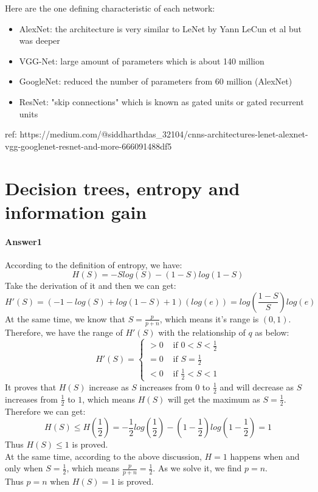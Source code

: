 \documentclass[paper=a4, fontsize=11pt]{scrartcl} %
\numberwithin{equation}{section} %
\numberwithin{figure}{section} %
\numberwithin{table}{section} %
\begin{document}
Here are the one defining characteristic of each network:
\begin{itemize}
	\item AlexNet: the architecture is very similar to LeNet by Yann LeCun et al but was deeper
	\item VGG-Net: large amount of parameters which is about 140 million
	\item GoogleNet: reduced the number of parameters from 60 million (AlexNet) 
	\item ResNet: "skip connections" which is known as gated units or gated recurrent units
\end{itemize}
ref: https://medium.com/@siddharthdas\_32104/cnns-architectures-lenet-alexnet-vgg-googlenet-resnet-and-more-666091488df5

\section{Decision trees, entropy and information gain}
\paragraph{\textbf{Answer1}}
According to the definition of entropy, we have:
\begin{equation*}
H\left ( S \right )=-Slog\left ( S \right )-\left ( 1-S \right )log\left ( 1-S \right )
\end{equation*}
Take the derivation of it and then we can get:
\begin{equation*}
{H}'\left ( S \right )=\left ( -1-log\left ( S \right )+log\left ( 1-S \right )+1 \right )\left ( log\left ( e \right ) \right )=log\left ( \frac{1-S}{S}  \right ) log\left ( e \right )
\end{equation*}
At the same time, we know that $S=\frac{p}{p+n}$, which means it's range is $\left ( 0, 1 \right )$. Therefore, we have the range of ${H}'\left ( S \right )$ with the relationship of $q$ as below:
\begin{equation*}
{H}'\left ( S \right )=\begin{cases}
> 0 & \text{ if } 0<S<\frac{1}{2} \\ 
= 0 & \text{ if } S=\frac{1}{2} \\ 
< 0 & \text{ if } \frac{1}{2}<S<1 
\end{cases}
\end{equation*}
It proves that $H\left ( S \right )$ increase as $S$ increases from $0$ to $\frac{1}{2}$ and will decrease as $S$ increases from $\frac{1}{2}$ to $1$, which means $H\left ( S \right )$ will get the maximum as $S=\frac{1}{2}$. Therefore we can get:
\begin{equation*}
H\left ( S \right )\leq H\left ( \frac{1}{2} \right )=-\frac{1}{2}log\left ( \frac{1}{2} \right )-\left ( 1-\frac{1}{2} \right )log\left ( 1-\frac{1}{2} \right )=1
\end{equation*}
Thus $H\left ( S \right )\leq 1$ is proved.
\\ At the same time, according to the above discussion, $H = 1$ happens when and only when $S = \frac{1}{2}$, which means $\frac{p}{p+n} = \frac{1}{2}$. As we solve it, we find $p = n$.
\\ Thus $p = n$ when $H\left ( S \right ) = 1$ is proved.
\end{document}
